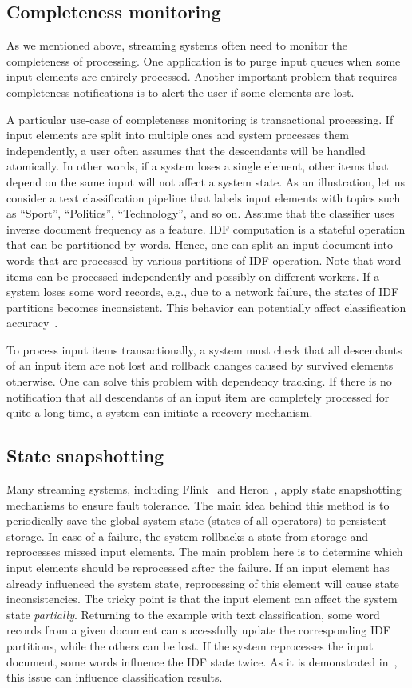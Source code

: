 \subsection{Completeness monitoring}
As we mentioned above, streaming systems often need to monitor the completeness of processing. One application is to purge input queues when some input elements are entirely processed. Another important problem that requires completeness notifications is to alert the user if some elements are lost.

A particular use-case of completeness monitoring is transactional processing. If input elements are split into multiple ones and system processes them independently, a user often assumes that the descendants will be handled atomically. In other words, if a system loses a single element, other items that depend on the same input will not affect a system state. As an illustration, let us consider a text classification pipeline that labels input elements with topics such as ``Sport'', ``Politics'', ``Technology'', and so on. Assume that the classifier uses inverse document frequency as a feature. IDF computation is a stateful operation that can be partitioned by words. Hence, one can split an input document into words that are processed by various partitions of IDF operation. Note that word items can be processed independently and possibly on different workers. If a system loses some word records, e.g., due to a network failure, the states of IDF partitions becomes inconsistent. This behavior can potentially affect classification accuracy~\cite{webirte}.

To process input items transactionally, a system must check that all descendants of an input item are not lost and rollback changes caused by survived elements otherwise. One can solve this problem with dependency tracking. If there is no notification that all descendants of an input item are completely processed for quite a long time, a system can initiate a recovery mechanism.

\subsection{State snapshotting}
Many streaming systems, including Flink~\cite{Carbone:2017:SMA:3137765.3137777} and Heron~\cite{Kulkarni:2015:THS:2723372.2742788}, apply state snapshotting mechanisms to ensure fault tolerance. The main idea behind this method is to periodically save the global system state (states of all operators) to persistent storage. In case of a failure, the system rollbacks a state from storage and reprocesses missed input elements. The main problem here is to determine which input elements should be reprocessed after the failure. If an input element has already influenced the system state, reprocessing of this element will cause state inconsistencies. The tricky point is that the input element can affect the system state {\em partially}. Returning to the example with text classification, some word records from a given document can successfully update the corresponding IDF partitions, while the others can be lost. If the system reprocesses the input document, some words influence the IDF state twice. As it is demonstrated in~\cite{webirte}, this issue can influence classification results.

